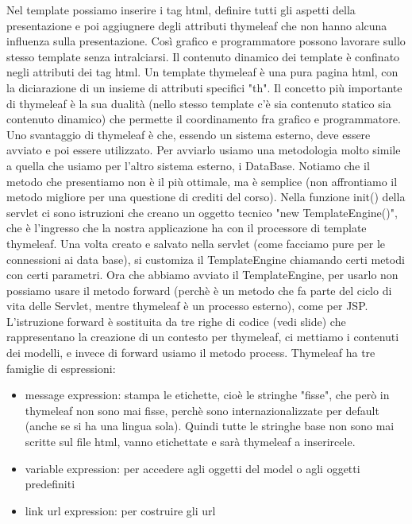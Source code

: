 Nel template possiamo inserire i tag html, definire tutti gli aspetti della presentazione e poi aggiugnere degli attributi thymeleaf che non hanno alcuna influenza sulla presentazione. Così grafico e programmatore possono lavorare sullo stesso template senza intralciarsi. Il contenuto dinamico dei template è confinato negli attributi dei tag html.\newline
\newline
Un template thymeleaf è una pura pagina html, con la diciarazione di un insieme di attributi specifici "th".\newline
\newline
Il concetto più importante di thymeleaf è la sua dualità (nello stesso template c'è sia contenuto statico sia contenuto dinamico) che permette il coordinamento fra grafico e programmatore.\newline
\newline
Uno svantaggio di thymeleaf è che, essendo un sistema esterno, deve essere avviato e poi essere utilizzato.\newline
Per avviarlo usiamo una metodologia molto simile a quella che usiamo per l'altro sistema esterno, i DataBase. Notiamo che il metodo che presentiamo non è il più ottimale, ma è semplice (non affrontiamo il metodo migliore per una questione di crediti del corso). Nella funzione init() della servlet ci sono istruzioni che creano un oggetto tecnico "new TemplateEngine()", che è l'ingresso che la nostra applicazione ha con il processore di template thymeleaf. Una volta creato e salvato nella servlet (come facciamo pure per le connessioni ai data base), si customiza il TemplateEngine chiamando certi metodi con certi parametri.\newline
Ora che abbiamo avviato il TemplateEngine, per usarlo non possiamo usare il metodo forward (perchè è un metodo che fa parte del ciclo di vita delle Servlet, mentre thymeleaf è un processo esterno), come per JSP. L'istruzione forward è sostituita da tre righe di codice (vedi slide) che rappresentano la creazione di un contesto per thymeleaf, ci mettiamo i contenuti dei modelli, e invece di forward usiamo il metodo process.\newline
\newline
Thymeleaf ha tre famiglie di espressioni:
\begin{itemize}
    \item message expression: stampa le etichette, cioè le stringhe "fisse", che però in thymeleaf non sono mai fisse, perchè sono internazionalizzate per default (anche se si ha una lingua sola). Quindi tutte le stringhe base non sono mai scritte sul file html, vanno etichettate e sarà thymeleaf a inserircele.
    \item variable expression: per accedere agli oggetti del model o agli oggetti predefiniti
    \item link url expression: per costruire gli url
\end{itemize}
